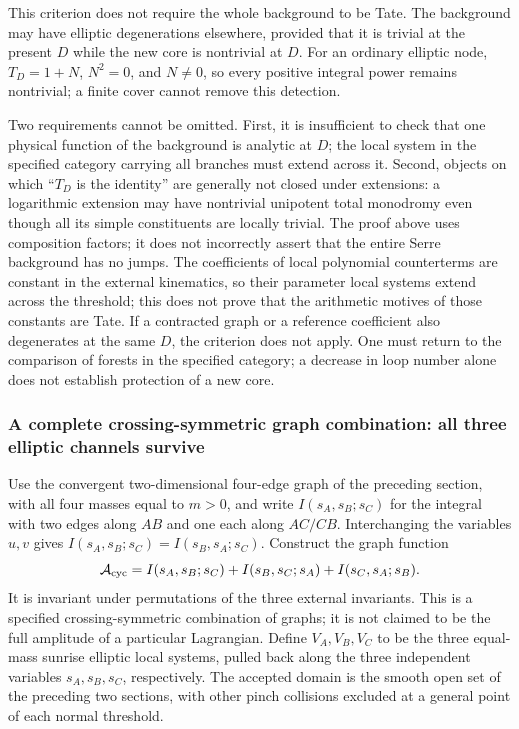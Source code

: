 \documentclass[11pt,a4paper,oneside]{article}
\theoremstyle{plain}
\theoremstyle{definition}
\theoremstyle{remark}
\numberwithin{equation}{section}
\begin{document}
This criterion does not require the whole background to be Tate. The background may have elliptic degenerations elsewhere,
provided that it is trivial at the present $D$ while the new core is nontrivial at $D$.
For an ordinary elliptic node, $T_D=1+N$, $N^2=0$, and $N\ne0$,
so every positive integral power remains nontrivial; a finite cover cannot remove this detection.

Two requirements cannot be omitted. First, it is insufficient to check that one physical function of the background is analytic at $D$;
the local system in the specified category carrying all branches must extend across it.
Second, objects on which ``$T_D$ is the identity'' are generally not closed under extensions:
a logarithmic extension may have nontrivial unipotent total monodromy even though all its simple constituents are locally trivial.
The proof above uses composition factors; it does not incorrectly assert that the entire Serre background has no jumps.
The coefficients of local polynomial counterterms are constant in the external kinematics,
so their parameter local systems extend across the threshold; this does not prove that the arithmetic motives of those constants are Tate.
If a contracted graph or a reference coefficient also degenerates at the same $D$, the criterion does not apply.
One must return to the comparison of forests in the specified category; a decrease in loop number alone does not establish protection of a new core.

\subsubsection{A complete crossing-symmetric graph combination: all three elliptic channels survive}
Use the convergent two-dimensional four-edge graph of the preceding section, with all four masses equal to $m>0$,
and write $I(s_A,s_B;s_C)$ for the integral with two edges along $AB$ and one each along $AC/CB$.
Interchanging the variables $u,v$ gives $I(s_A,s_B;s_C)=I(s_B,s_A;s_C)$.
Construct the graph function
\begin{equation}\label{unified:eq:cyclicice}
 \mathcal A_{\rm cyc}
 =I(s_A,s_B;s_C)+I(s_B,s_C;s_A)+I(s_C,s_A;s_B).
\end{equation}
It is invariant under permutations of the three external invariants. This is a specified crossing-symmetric combination of graphs;
it is not claimed to be the full amplitude of a particular Lagrangian.
Define $V_A,V_B,V_C$ to be the three equal-mass sunrise elliptic local systems,
pulled back along the three independent variables $s_A,s_B,s_C$, respectively.
The accepted domain is the smooth open set of the preceding two sections, with other pinch collisions excluded at a general point of each normal threshold.
\end{document}
